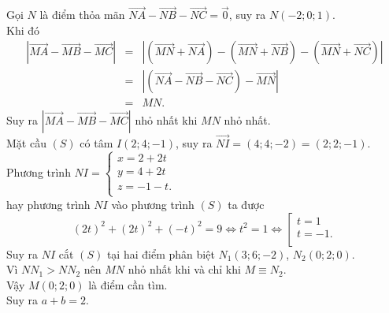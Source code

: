 \begin{ex}
{\begin{center}
\begin{tikzpicture}[>=stealth, line join=round, line cap=round, font=\footnotesize, scale=1]
		\end{tikzpicture}
	\end{center}
	Gọi $N$ là điểm thỏa mãn $\overrightarrow{NA}-\overrightarrow{NB}-\overrightarrow{NC}=\overrightarrow{0}$, suy ra $N\left( -2;0;1 \right)$.\\
	Khi đó 
	\allowdisplaybreaks
	\begin{eqnarray*}
		\left| \overrightarrow{MA}-\overrightarrow{MB}-\overrightarrow{MC} \right|&=&\left| \left( \overrightarrow{MN}+\overrightarrow{NA} \right)-\left( \overrightarrow{MN}+\overrightarrow{NB} \right)-\left( \overrightarrow{MN}+\overrightarrow{NC} \right) \right|\\
		&=&\left| \left( \overrightarrow{NA}-\overrightarrow{NB}-\overrightarrow{NC} \right)-\overrightarrow{MN} \right|\\
		&=&MN.
	\end{eqnarray*}
	Suy ra $\left| \overrightarrow{MA}-\overrightarrow{MB}-\overrightarrow{MC} \right|$ nhỏ nhất khi $MN$ nhỏ nhất.\\
	Mặt cầu $(S)$ có tâm $I\left( 2;4;-1 \right)$, suy ra
	$\overrightarrow{NI}=\left( 4;4;-2 \right)=\left( 2;2;-1 \right)$.\\
	Phương trình $NI=\left\{ \begin{matrix}
		x=2+2t \\
		y=4+2t \\
		z=-1-t. \\
	\end{matrix} \right.$ \\
	hay phương trình $NI$ vào phương trình $(S)$ ta được $${{\left( 2t \right)}^2}+{{\left( 2t \right)}^2}+{{\left( -t \right)}^2}=9\Leftrightarrow {t^2}=1\Leftrightarrow \left[ \begin{matrix}
		t=1 \\
		t=-1. \\
	\end{matrix} \right.$$
	Suy ra $NI$ cắt $(S)$ tại hai điểm phân biệt $N_1\left( 3;6;-2 \right)$, $N_2\left( 0;2;0 \right)$.\\
	Vì $NN_1>NN_2$ nên $MN$ nhỏ nhất khi và chỉ khi $M\equiv N_2$.\\
	Vậy $M\left( 0;2;0 \right)$ là điểm cần tìm.\\
	Suy ra $a+b=2.$\\
}
\end{ex}
